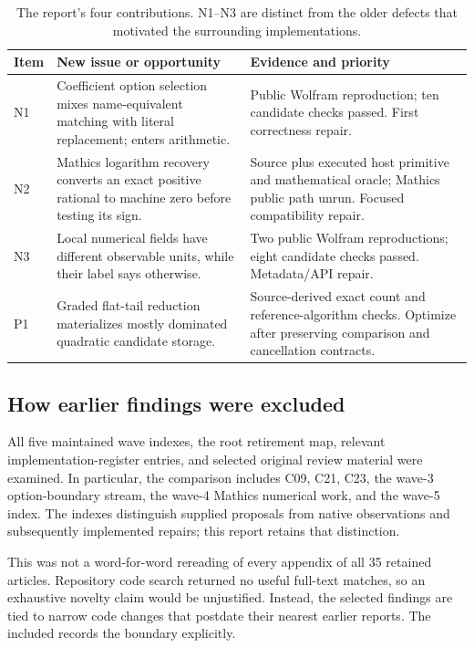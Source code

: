 \documentclass[11pt,letterpaper]{article}
\newcommand{\code}[1]{\texttt{\detokenize{#1}}}
\begin{document}
\begin{table}[htbp]
\small
\begin{tabularx}{\linewidth}{@{}l p{.35\linewidth} Y@{}}
\toprule
Item & New issue or opportunity & Evidence and priority \\
\midrule
N1 & Coefficient option selection mixes name-equivalent matching with literal replacement; \code{"Power"} enters arithmetic. & Public Wolfram reproduction; ten candidate checks passed. First correctness repair. \\
N2 & Mathics logarithm recovery converts an exact positive rational to machine zero before testing its sign. & Source plus executed host primitive and mathematical oracle; Mathics public path unrun. Focused compatibility repair. \\
N3 & Local numerical fields have different observable units, while their label says otherwise. & Two public Wolfram reproductions; eight candidate checks passed. Metadata/API repair. \\
P1 & Graded flat-tail reduction materializes mostly dominated quadratic candidate storage. & Source-derived exact count and reference-algorithm checks. Optimize after preserving comparison and cancellation contracts. \\
\bottomrule
\end{tabularx}
\caption{The report's four contributions. N1--N3 are distinct from the older defects that motivated the surrounding implementations.}
\label{tab:findings}
\end{table}

\subsection{How earlier findings were excluded}
All five maintained wave indexes, the root retirement map, relevant implementation-register entries, and selected original review material were examined. In particular, the comparison includes C09, C21, C23, the wave-3 option-boundary stream, the wave-4 Mathics numerical work, and the wave-5 index. The indexes distinguish supplied proposals from native observations and subsequently implemented repairs; this report retains that distinction.~\cite{reviewindex,wave1,wave2,wave3,wave4,wave5,status}

This was not a word-for-word rereading of every appendix of all 35 retained articles. Repository code search returned no useful full-text matches, so an exhaustive novelty claim would be unjustified. Instead, the selected findings are tied to narrow code changes that postdate their nearest earlier reports. The included \code{evidence/novelty-ledger.md} records the boundary explicitly.
\end{document}
